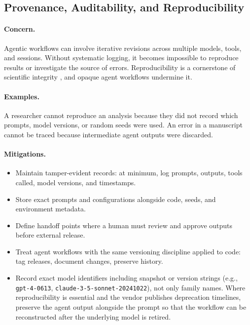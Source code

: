 \documentclass[11pt,letterpaper]{article}
\begin{document}
\subsection{Provenance, Auditability, and Reproducibility}

\paragraph{Concern.} Agentic workflows can involve iterative revisions across multiple models, tools, and sessions. Without systematic logging, it becomes impossible to reproduce results or investigate the source of errors. Reproducibility is a cornerstone of scientific integrity \cite{baker2016,nosek2015}, and opaque agent workflows undermine it.

\paragraph{Examples.} A researcher cannot reproduce an analysis because they did not record which prompts, model versions, or random seeds were used. An error in a manuscript cannot be traced because intermediate agent outputs were discarded.

\paragraph{Mitigations.}
\begin{itemize}[leftmargin=*]
    \item Maintain tamper-evident records: at minimum, log prompts, outputs, tools called, model versions, and timestamps.
    \item Store exact prompts and configurations alongside code, seeds, and environment metadata.
    \item Define handoff points where a human must review and approve outputs before external release.
    \item Treat agent workflows with the same versioning discipline applied to code: tag releases, document changes, preserve history.
    \item Record exact model identifiers including snapshot or version strings (e.g., \texttt{gpt-4-0613}, \texttt{claude-3-5-sonnet-20241022}), not only family names. Where reproducibility is essential and the vendor publishes deprecation timelines, preserve the agent output alongside the prompt so that the workflow can be reconstructed after the underlying model is retired.
\end{itemize}
\end{document}
